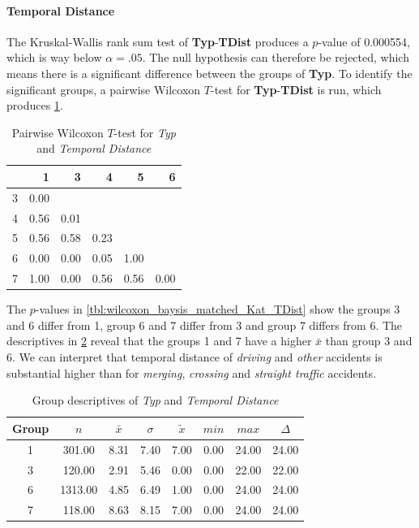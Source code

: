\paragraph{Temporal Distance}
The Kruskal-Wallis rank sum test of \textbf{Typ}-\textbf{TDist} produces a $p$-value of 0.000554, which is way below $\alpha=.05$. The null hypothesis can therefore be rejected, which means there is a significant difference between the groups of \textbf{Typ}. To identify the significant groups, a pairwise Wilcoxon $T$-test for \textbf{Typ}-\textbf{TDist} is run, which produces \cref{tbl:wilcoxon_baysis_matched_Typ_TDist}. 
\begin{table}[ht]
	\small
	\centering
	\begin{tabular}{rrrrrr}
		\toprule
		& 1 & 3 & 4 & 5 & 6 \\ 
		\midrule
		3 & 0.00 &  &  &  &  \\ 
		4 & 0.56 & 0.01 &  &  &  \\ 
		5 & 0.56 & 0.58 & 0.23 &  &  \\ 
		6 & 0.00 & 0.00 & 0.05 & 1.00 &  \\ 
		7 & 1.00 & 0.00 & 0.56 & 0.56 & 0.00 \\ 
		\bottomrule
	\end{tabular}
	\caption{Pairwise Wilcoxon $T$-test for \textit{Typ} and \textit{Temporal Distance}}
	\label{tbl:wilcoxon_baysis_matched_Typ_TDist}
\end{table}
The $p$-values in \cref{tbl:wilcoxon_baysis_matched_Kat_TDist} show the groups 3 and 6 differ from 1, group 6 and 7 differ from 3 and group 7 differs from 6. The descriptives in \cref{tbl:descriptives_baysis_matched_Typ_TDist} reveal that the groups 1 and 7 have a higher $\bar{x}$ than group 3 and 6. We can interpret that temporal distance of \textit{driving} and \textit{other} accidents is substantial higher than for \textit{merging}, \textit{crossing} and \textit{straight traffic} accidents. 
\begin{table}[ht]
	\small
	\centering
	\begin{tabular}{c|c|c|c|c|c|c|c}
		\toprule
		Group & $n$ & $\bar{x}$ & $\sigma$ & $\tilde{x}$ & $min$ & $max$ & $\Delta$ \\ 
		\midrule
		1 & 301.00 & 8.31 & 7.40 & 7.00 & 0.00 & 24.00 & 24.00 \\ 
		3 & 120.00 & 2.91 & 5.46 & 0.00 & 0.00 & 22.00 & 22.00 \\ 
		6 & 1313.00 & 4.85 & 6.49 & 1.00 & 0.00 & 24.00 & 24.00 \\ 
		7 & 118.00 & 8.63 & 8.15 & 7.00 & 0.00 & 24.00 & 24.00 \\ 
		\bottomrule
	\end{tabular}
	\caption{Group descriptives of \textit{Typ} and \textit{Temporal Distance}}
	\label{tbl:descriptives_baysis_matched_Typ_TDist}
\end{table}

